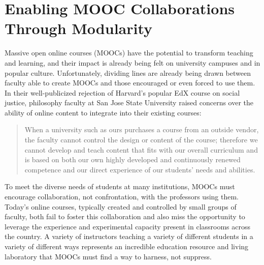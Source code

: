 

\def\thetitle{Enabling MOOC Collaborations Through Modularity}
\def\shorttitle{Modular MOOCs}
\def\theauthors{Geoffrey Challen \textit{University at Buffalo}}
\def\shortauthors{Challen}
\def\submissiondate{\today}
\def\whitepapername{Learning with MOOCs}


\pagestyle{whitepaper}
\thispagestyle{emptywhitepaper}

\chapter{\thetitle}

Massive open online courses (MOOCs) have the potential to transform teaching
and learning, and their impact is already being felt on university campuses
and in popular culture. Unfortunately, dividing lines are already being drawn
between faculty able to create MOOCs and those encouraged or even forced to
use them. In their well-publicized rejection of Harvard's popular EdX course
on social justice, philosophy faculty at San Jose State University raised
concerns over the ability of online content to integrate into their existing
courses:

\begin{quote}

When a university such as ours purchases a course from an outside vendor, the
faculty cannot control the design or content of the course; therefore we
cannot develop and teach content that fits with our overall curriculum and is
based on both our own highly developed and continuously renewed competence
and our direct experience of our students' needs and abilities.

\end{quote}

To meet the diverse needs of students at many institutions, MOOCs must
encourage collaboration, not confrontation, with the professors using them.
Today's online courses, typically created and controlled by small groups of
faculty, both fail to foster this collaboration and also miss the opportunity
to leverage the experience and experimental capacity present in classrooms
across the country. A variety of instructors teaching a variety of different
students in a variety of different ways represents an incredible education
resource and living laboratory that MOOCs must find a way to harness, not
suppress.

